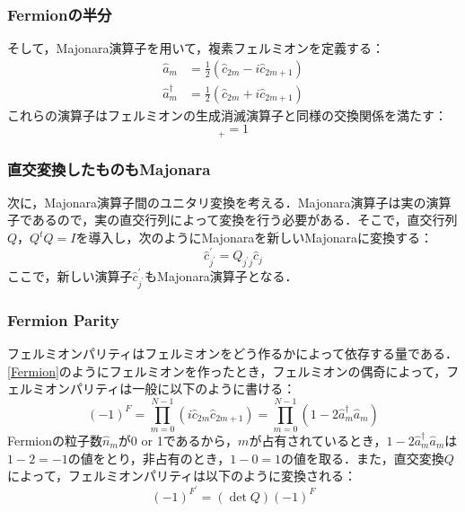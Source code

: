 \documentclass[dvipdfmx,autodetect-engine]{jsarticle}
\begin{document}
\subsubsection{Fermionの半分}
そして，Majonara演算子を用いて，複素フェルミオンを定義する：
\begin{align}\label{Fermion}
    \hat{a}_m &= \frac{1}{2}
    (\hat{c}_{2m} - i\hat{c}_{2m+1})\\[10pt]
    \hat{a}_m^{\dagger} &= \frac{1}{2}
    (\hat{c}_{2m} + i\hat{c}_{2m+1})
\end{align}
これらの演算子はフェルミオンの生成消滅演算子と同様の交換関係を満たす：
\begin{equation}
    [\hat{a}_m,\ \hat{a}_m^{\dagger}]_+ = 1
\end{equation}


\subsubsection{直交変換したものもMajonara}
次に，Majonara演算子間のユニタリ変換を考える．Majonara演算子は実の演算子であるので，実の直交行列によって変換を行う必要がある．そこで，直交行列$Q$，$Q^{t}Q=I$を導入し，次のようにMajonaraを新しいMajonaraに変換する：
\begin{equation}
    \hat{c}^{\prime}_{j^{\prime}} = Q_{j^\prime j} \hat{c}_{j}
\end{equation}
ここで，新しい演算子$\hat{c}^{\prime}_{j^{\prime}}$もMajonara演算子となる．



\subsubsection{Fermion Parity}
フェルミオンパリティはフェルミオンをどう作るかによって依存する量である．\eqref{Fermion}のようにフェルミオンを作ったとき，フェルミオンの偶奇によって，フェルミオンパリティは一般に以下のように書ける：
\begin{equation}
    (-1)^{F} = \prod_{m=0}^{N-1}(i\hat{c}_{2m}\hat{c}_{2m+1})
    =\prod_{m=0}^{N-1} (1-2\hat{a}_{m}^{\dagger}\hat{a}_{m})
\end{equation}
Fermionの粒子数$\hat{n}_m$が0 or 1であるから，$m$が占有されているとき，$1-2\hat{a}_m^{\dagger}\hat{a}_m$は$1-2=-1$の値をとり，非占有のとき，$1-0=1$の値を取る．また，直交変換$Q$によって，フェルミオンパリティは以下のように変換される：
\begin{equation}
    (-1)^{F^\prime} = (\det{Q})(-1)^F
\end{equation}
\end{document}
